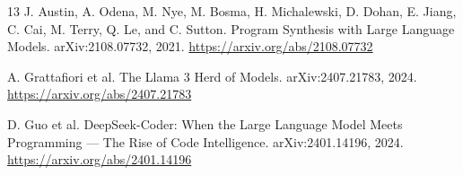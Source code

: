 \documentclass[11pt]{article}
\begin{document}
\begin{thebibliography}{13}
J. Austin, A. Odena, M. Nye, M. Bosma, H. Michalewski, D. Dohan, E. Jiang, C. Cai, M. Terry, Q. Le, and C. Sutton.
Program Synthesis with Large Language Models.
arXiv:2108.07732, 2021.
\url{https://arxiv.org/abs/2108.07732}

A. Grattafiori et al.
The Llama 3 Herd of Models.
arXiv:2407.21783, 2024.
\url{https://arxiv.org/abs/2407.21783}

D. Guo et al.
DeepSeek-Coder: When the Large Language Model Meets Programming --- The Rise of Code Intelligence.
arXiv:2401.14196, 2024.
\url{https://arxiv.org/abs/2401.14196}

\end{thebibliography}
\end{document}
